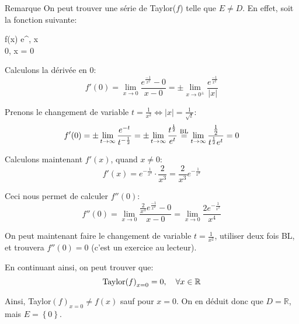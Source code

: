\documentclass[a4paper]{article}
\begin{document}
\begin{parag}{Remarque}
    On peut trouver une série de Taylor($f$) telle que $E \neq D$. En effet, soit la fonction suivante:
    \begin{functionbypart}{f\left(x\right)}
    e^{}, \mathspace x  \\
    0, \mathspace x = 0
    \end{functionbypart}

    Calculons la dérivée en 0: 
    \[f'\left(0\right) = \lim_{x \to 0} \frac{e^{\frac{-1}{x^2}} - 0}{x - 0} = \pm \lim_{x \to 0^{\pm}} \frac{e^{\frac{-1}{x^2}}}{\left|x\right|} \]
    
    Prenons le changement de variable $t = \frac{1}{x^2} \iff \left|x\right| = \frac{1}{\sqrt{t}}$: 
    \[f'\left(0\right) = \pm \lim_{t \to \infty} \frac{e^{-t}}{t^{- \frac{1}{2}}} = \pm \lim_{t \to \infty} \frac{t^{\frac{1}{2}}}{e^t} \over{=}{BL} \lim_{t \to \infty} \frac{\frac{1}{2}}{t^{\frac{1}{2}} e^{t}} = 0\]
    
    Calculons maintenant $f'\left(x\right)$, quand $x \neq 0$: 
    \[f'\left(x\right) = e^{- \frac{1}{x^2}} \cdot \frac{2}{x^3} = \frac{2}{x^3} e^{-\frac{1}{x^2}}\]
    
    Ceci nous permet de calculer $f''\left(0\right)$:
    \[f''\left(0\right) = \lim_{x \to 0} \frac{\frac{2}{x^3} e^{\frac{-1}{x^2}} - 0}{x - 0} = \lim_{x \to 0} \frac{2e^{-\frac{1}{x^2}}}{x^4}\]
    
    On peut maintenant faire le changement de variable $t = \frac{1}{x^2}$, utiliser deux fois BL, et trouvera $f''\left(0\right) = 0$ (c'est un exercice au lecteur).

    En continuant ainsi, on peut trouver que: 
    \[\Taylor\left(f\right)_{x = 0} = 0, \mathspace \forall x \in \mathbb{R}\]
    
    Ainsi, Taylor$\left(f\right)_{x=0} \neq f\left(x\right)$ sauf pour $x = 0$. On en déduit donc que $D = \mathbb{R}$, mais $E = \left\{0\right\}$.

\end{parag}
\end{document}
